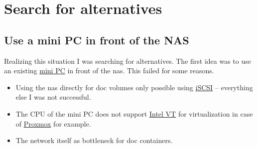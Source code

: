 

\section{Search for alternatives}

\subsection{Use a mini PC in front of the NAS}

Realizing this situation I was searching for alternatives. The first idea was
to use an existing \href{https://www.zotac.com/at/product/mini_pcs/id41-plus}{mini PC}
in front of the \gls{nas}. This failed for some reasons.

\begin{itemize}
    \item Using the \gls{nas} directly for \gls{doc} volumes only possible using
          \linebreak
          \href{https://en.wikipedia.org/wiki/ISCSI}{iSCSI} -- everything else
          I was not successful.
    \item The CPU of the mini PC does not support \href{https://en.wikipedia.org/wiki/X86_virtualization}{Intel VT}
          for virtualization in case of \href{https://www.proxmox.com/}{Proxmox} for
          example.
    \item The network itself as bottleneck for \gls{doc} containers.
\end{itemize}

